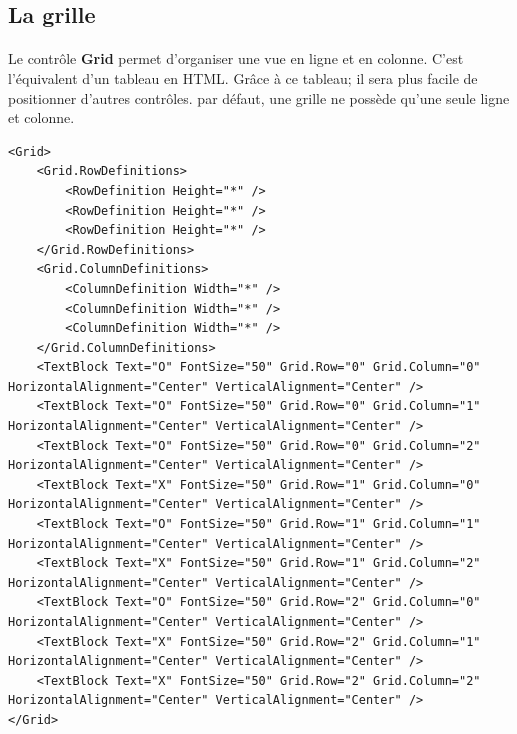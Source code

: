 \documentclass[twoside,UTF8]{EPURapport}
\begin{document}
		\subsection{La grille}
\paragraph{}
Le contrôle \textbf{Grid} permet d'organiser une vue en ligne et en colonne. C'est l'équivalent d'un tableau en HTML. Grâce à ce tableau; il sera plus facile de positionner d'autres contrôles. par défaut, une grille ne possède qu'une seule ligne et colonne. 

\begin{lstlisting}[caption={Exemple d'utilisation du contrôle \textbf{Grid}}]
<Grid>
    <Grid.RowDefinitions>
        <RowDefinition Height="*" />
        <RowDefinition Height="*" />
        <RowDefinition Height="*" />
    </Grid.RowDefinitions>
    <Grid.ColumnDefinitions>
        <ColumnDefinition Width="*" />
        <ColumnDefinition Width="*" />
        <ColumnDefinition Width="*" />
    </Grid.ColumnDefinitions>
	<TextBlock Text="O" FontSize="50" Grid.Row="0" Grid.Column="0" HorizontalAlignment="Center" VerticalAlignment="Center" />
    <TextBlock Text="O" FontSize="50" Grid.Row="0" Grid.Column="1" HorizontalAlignment="Center" VerticalAlignment="Center" />
    <TextBlock Text="O" FontSize="50" Grid.Row="0" Grid.Column="2" HorizontalAlignment="Center" VerticalAlignment="Center" />
    <TextBlock Text="X" FontSize="50" Grid.Row="1" Grid.Column="0" HorizontalAlignment="Center" VerticalAlignment="Center" />
    <TextBlock Text="O" FontSize="50" Grid.Row="1" Grid.Column="1" HorizontalAlignment="Center" VerticalAlignment="Center" />
    <TextBlock Text="X" FontSize="50" Grid.Row="1" Grid.Column="2" HorizontalAlignment="Center" VerticalAlignment="Center" />
    <TextBlock Text="O" FontSize="50" Grid.Row="2" Grid.Column="0" HorizontalAlignment="Center" VerticalAlignment="Center" />
    <TextBlock Text="X" FontSize="50" Grid.Row="2" Grid.Column="1" HorizontalAlignment="Center" VerticalAlignment="Center" />
    <TextBlock Text="X" FontSize="50" Grid.Row="2" Grid.Column="2" HorizontalAlignment="Center" VerticalAlignment="Center" />
</Grid>
\end{lstlisting}
\end{document}
